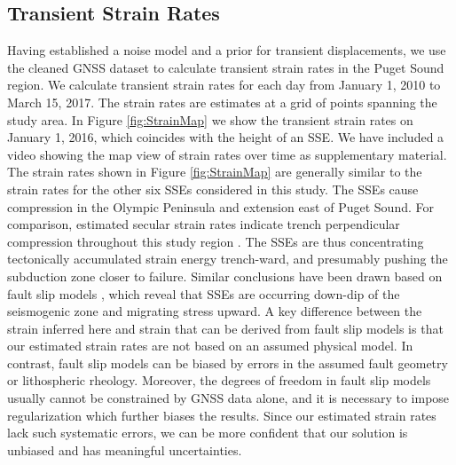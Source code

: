 \documentclass[10pt,letter]{article}
\begin{document}
\subsection{Transient Strain Rates}\label{sec:Results} 
Having established a noise model and a prior for transient displacements, we use the cleaned GNSS dataset to calculate transient strain rates in the Puget Sound region.  We calculate transient strain rates for each day from January 1, 2010 to March 15, 2017. The strain rates are estimates at a grid of points spanning the study area. In Figure \ref{fig:StrainMap} we show the transient strain rates on January 1, 2016, which coincides with the height of an SSE. We have included a video showing the map view of strain rates over time as supplementary material. The strain rates shown in Figure \ref{fig:StrainMap} are generally similar to the strain rates for the other six SSEs considered in this study. The SSEs cause compression in the Olympic Peninsula and extension east of Puget Sound. For comparison, estimated secular strain rates indicate trench perpendicular compression throughout this study region \citep{Murray2000,McCaffrey2007,McCaffrey2013}. The SSEs are thus concentrating tectonically accumulated strain energy trench-ward, and presumably pushing the subduction zone closer to failure. Similar conclusions have been drawn based on fault slip models \citep[e.g.,][]{Dragert2001,Wech2009,Schmidt2010}, which reveal that SSEs are occurring down-dip of the seismogenic zone and migrating stress upward. A key difference between the strain inferred here and strain that can be derived from fault slip models is that our estimated strain rates are not based on an assumed physical model. In contrast, fault slip models can be biased by errors in the assumed fault geometry or lithospheric rheology. Moreover, the degrees of freedom in fault slip models usually cannot be constrained by GNSS data alone, and it is necessary to impose regularization which further biases the results. Since our estimated strain rates lack such systematic errors, we can be more confident that our solution is unbiased and has meaningful uncertainties.  
\end{document}
